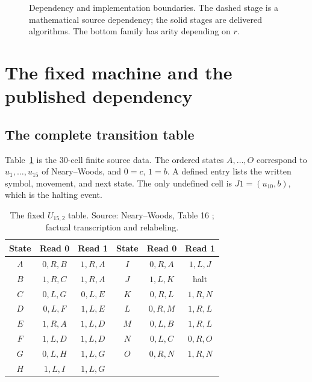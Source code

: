 \documentclass[11pt,letterpaper]{article}
\theoremstyle{definition}
\theoremstyle{remark}
\newcommand{\diag}{\operatorname{diag}}
\newcommand{\rev}{\operatorname{rev}}
\begin{document}
\begin{figure}[ht]
\centering
{}
\caption{Dependency and implementation boundaries. The dashed stage is a mathematical source dependency; the solid stages are delivered algorithms. The bottom family has arity depending on $r$.}
\label{gts:um:fig:chain}
\end{figure}

\section{The fixed machine and the published dependency}
\label{gts:um:sec:machine}
\subsection{The complete transition table}
Table~\ref{gts:um:tab:machine} is the 30-cell finite source data. The ordered states $A,\ldots,O$ correspond to $u_1,\ldots,u_{15}$ of Neary--Woods, and $0=c$, $1=b$. A defined entry lists the written symbol, movement, and next state. The only undefined cell is $J1=(u_{10},b)$, which is the halting event.

\begin{table}[ht]
\centering
\begin{tabular}{ccc@{\qquad}ccc}
\toprule
State & Read 0 & Read 1 & State & Read 0 & Read 1\\\midrule
$A$ & $0,R,B$ & $1,R,A$ & $I$ & $0,R,A$ & $1,L,J$\\
$B$ & $1,R,C$ & $1,R,A$ & $J$ & $1,L,K$ & halt\\
$C$ & $0,L,G$ & $0,L,E$ & $K$ & $0,R,L$ & $1,R,N$\\
$D$ & $0,L,F$ & $1,L,E$ & $L$ & $0,R,M$ & $1,R,L$\\
$E$ & $1,R,A$ & $1,L,D$ & $M$ & $0,L,B$ & $1,R,L$\\
$F$ & $1,L,D$ & $1,L,D$ & $N$ & $0,L,C$ & $0,R,O$\\
$G$ & $0,L,H$ & $1,L,G$ & $O$ & $0,R,N$ & $1,R,N$\\
$H$ & $1,L,I$ & $1,L,G$ & & &\\\bottomrule
\end{tabular}
\caption{The fixed $U_{15,2}$ table. Source: Neary--Woods, Table 16 \cite{um-NW}; factual transcription and relabeling.}
\label{gts:um:tab:machine}
\end{table}
\end{document}
